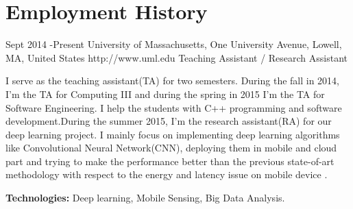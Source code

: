 \documentclass[10pt]{article} %
\begin{document}



\section{Employment History}

\job
{Sept 2014 -}{Present}
{University of Massachusetts, One University Avenue, Lowell, MA, United States}
{http://www.uml.edu}
{Teaching Assistant / Research Assistant}
{I serve as the teaching assistant(TA) for two semesters. 
During the fall in 2014, I'm the TA for Computing III and during the spring in 2015 I'm the TA for Software Engineering. I help the students with C++ programming and software development.During the summer 2015, I'm the research assistant(RA) for our deep learning project. I mainly focus on implementing deep learning algorithms like Convolutional Neural Network(CNN), deploying them in mobile and cloud part and trying to make the performance better than the previous state-of-art methodology with respect to the energy and latency issue on mobile device .\\ 
\rule{0mm}{5mm}\textbf{Technologies:} Deep learning, Mobile Sensing, Big Data Analysis.}

\end{document}
